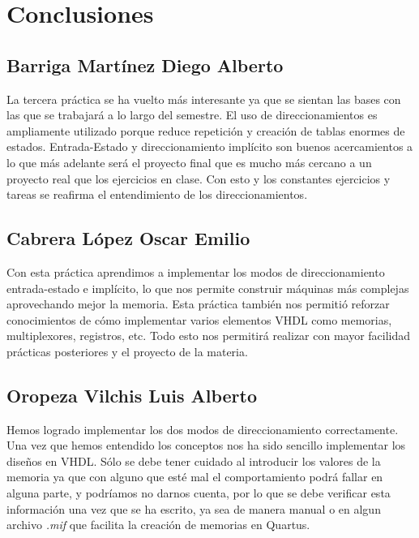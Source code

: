 \documentclass[12pt]{article}
\def\luis{Oropeza Vilchis Luis Alberto}
\def\diego{Barriga Mart\'inez Diego Alberto}
\def\emilio{Cabrera L\'opez Oscar Emilio}
\begin{document}
\section*{Conclusiones}

\subsection*{\diego}
La tercera pr\'actica se ha vuelto m\'as interesante ya que se sientan las bases con las que se trabajar\'a a lo largo del semestre. El uso de direccionamientos es ampliamente utilizado porque reduce repetici\'on y creaci\'on de tablas enormes de estados. Entrada-Estado y direccionamiento impl\'icito son buenos acercamientos a lo que m\'as adelante ser\'a el proyecto final que es mucho m\'as cercano a un proyecto real que los ejercicios en clase. Con esto y los constantes ejercicios y tareas se reafirma el entendimiento de los direccionamientos.
\subsection*{\emilio}
Con esta pr\'actica aprendimos a implementar los modos de direccionamiento entrada-estado e impl\'icito, lo que nos permite construir m\'aquinas m\'as complejas aprovechando mejor la memoria. Esta pr\'actica tambi\'en nos permiti\'o reforzar conocimientos de c\'omo implementar varios elementos VHDL como memorias, multiplexores, registros, etc. Todo esto nos permitir\'a realizar con mayor facilidad pr\'acticas posteriores y el proyecto de la materia.
\subsection*{\luis}
Hemos logrado implementar los dos modos de direccionamiento correctamente. Una vez que hemos entendido los conceptos nos ha sido sencillo implementar los diseños en VHDL. Sólo se debe tener cuidado al introducir los valores de la memoria ya que con alguno que esté mal el comportamiento podrá fallar en alguna parte, y podr\'iamos no darnos cuenta, por lo que se debe verificar esta información una vez que se ha escrito, ya sea de manera manual o en algun archivo \textit{.mif} que facilita la creaci\'on de memorias en Quartus.
\end{document}
